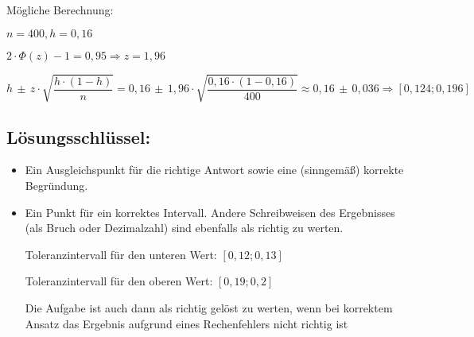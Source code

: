 \begin{langesbeispiel}
{\begin{enumerate}
		Mögliche Berechnung:
		
		$n=400, h=0,16$
		
		$2\cdot\Phi(z)-1=0,95 \Rightarrow z=1,96$
		
		$$h\,\pm\,z\cdot\sqrt{\frac{h\cdot(1-h)}{n}}=0,16\,\pm\, 1,96\cdot\sqrt{\frac{0,16\cdot(1-0,16)}{400}}\approx 0,16\,\pm\, 0,036 \Rightarrow [0,124;0,196]$$

	\subsection{Lösungsschlüssel:}
	
\begin{itemize}
	\item Ein Ausgleichspunkt für die richtige Antwort sowie eine (sinngemäß) korrekte Begründung.
	\item Ein Punkt für ein korrektes Intervall. Andere Schreibweisen des Ergebnisses (als Bruch oder Dezimalzahl) sind ebenfalls als richtig zu werten. 
	
	Toleranzintervall für den unteren Wert: $[0,12; 0,13]$ 
	
	Toleranzintervall für den oberen Wert: $[0,19; 0,2]$ 
	
	Die Aufgabe ist auch dann als richtig gelöst zu werten, wenn bei korrektem Ansatz das Ergebnis aufgrund eines Rechenfehlers nicht richtig ist
\end{itemize}

\end{enumerate}}
		\end{langesbeispiel}